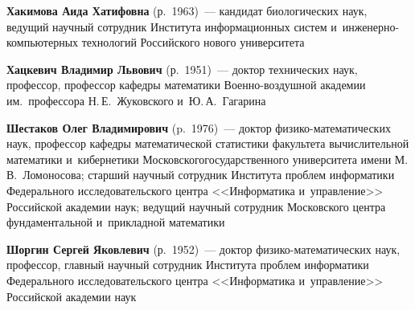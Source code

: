 \begin{multicols}{2}
 \vspace*{2pt}

\noindent
\textbf{Хакимова Аида Хатифовна} (р.\ 1963)~--- 
кандидат биологических наук, ведущий научный сотрудник Института информационных сис\-тем 
и~ин\-же\-нер\-но-компью\-тер\-ных технологий Российского нового университета

 \vspace*{2pt}

\noindent
\textbf{Хацкевич Владимир Львович} (р.\ 1951)~--- 
доктор технических наук, профессор, профессор кафедры математики Во\-ен\-но-воз\-душ\-ной академии им.\ профессора Н.\,Е.~Жуковского и~Ю.\,А.~Гагарина 

 \vspace*{2pt}

\noindent
\textbf{Шестаков Олег Владимирович} (p.\ 1976)~--- 
доктор фи\-зи\-ко-ма\-те\-ма\-ти\-че\-ских наук, профессор ка\-фед\-ры математической ста\-ти\-сти\-ки 
факультета вы\-чис\-ли\-тель\-ной математики и~кибернетики Московского\linebreak государственного университета имени М.\,В.~Ломоносова; 
старший научный со\-труд\-ник Института проб\-лем информатики Федерального исследовательского цент\-ра <<Информатика и~\mbox{управ\-ле\-ние}>>
 Российской академии наук; ведущий научный со\-труд\-ник Московского цент\-ра фундаментальной и~при\-клад\-ной математики
 
 \vspace*{2pt}
 
\noindent
\textbf{Шоргин Сергей Яковлевич} (р.\ 1952)~--- доктор фи\-зи\-ко-ма\-те\-ма\-ти\-че\-ских наук, профессор, главный научный со\-труд\-ник 
Института проб\-лем информатики Федерального исследовательского цент\-ра <<Информатика и~управ\-ле\-ние>> Российской академии наук





\def\leftkol{ОБ АВТОРАХ}

\def\rightkol{ОБ АВТОРАХ}


 \label{end\stat}



\end{multicols}

\def\leftkol{ОБ АВТОРАХ}
\def\rightkol{ОБ АВТОРАХ}

\newpage
